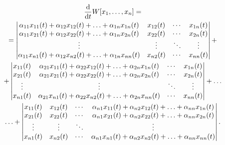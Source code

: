 \begin{multline*}
	\frac{\mathop{}\!\mathrm{d}}{\mathop{}\!\mathrm{d} t} W[x_1, \ldots, x_n] = \\
	= \begin{vmatrix} \alpha_{11} x_{11} (t) + \alpha_{12} x_{12}(t) + \ldots + \alpha_{1n} x_{1n}(t) & x_{12}(t) & \cdots & x_{1n}(t) \\  \alpha_{11} x_{21} (t) + \alpha_{12} x_{22}(t) + \ldots + \alpha_{1n} x_{2n}(t) & x_{22}(t) & \cdots & x_{2n}(t) \\ \vdots & \vdots & \ddots & \vdots \\ \alpha_{11} x_{n1} (t) + \alpha_{12} x_{n2}(t) + \ldots + \alpha_{1n} x_{nn}(t) & x_{n2}(t) & \cdots & x_{nn}(t) \end{vmatrix} + \\
	+ \begin{vmatrix} x_{11}(t) & \alpha_{21} x_{11} (t) + \alpha_{22} x_{12}(t) + \ldots + \alpha_{2n} x_{1n}(t) & \cdots & x_{1n}(t) \\ x_{21}(t) & \alpha_{21} x_{21} (t) + \alpha_{22} x_{22}(t) + \ldots + \alpha_{2n} x_{2n}(t) & \cdots & x_{2n}(t) \\ \vdots & \vdots & \ddots & \vdots \\ x_{n1}(t) & \alpha_{21} x_{n1} (t) + \alpha_{22} x_{n2}(t) + \ldots + \alpha_{2n} x_{nn}(t) & \cdots & x_{nn}(t) \end{vmatrix} + \ldots \\
	\ldots + \begin{vmatrix} x_{11}(t) & x_{12}(t) & \cdots & \alpha_{n1} x_{11} (t) + \alpha_{n2} x_{12}(t) + \ldots + \alpha_{nn} x_{1n}(t) \\ x_{21}(t) & x_{22}(t) & \cdots & \alpha_{n1} x_{21} (t) + \alpha_{n2} x_{22}(t) + \ldots + \alpha_{nn} x_{2n}(t) \\ \vdots & \vdots & \ddots & \vdots \\ x_{n1}(t) & x_{n2}(t) & \cdots & \alpha_{n1} x_{n1} (t) + \alpha_{n2} x_{n2}(t) + \ldots + \alpha_{nn} x_{nn}(t) \end{vmatrix}.
\end{multline*}

